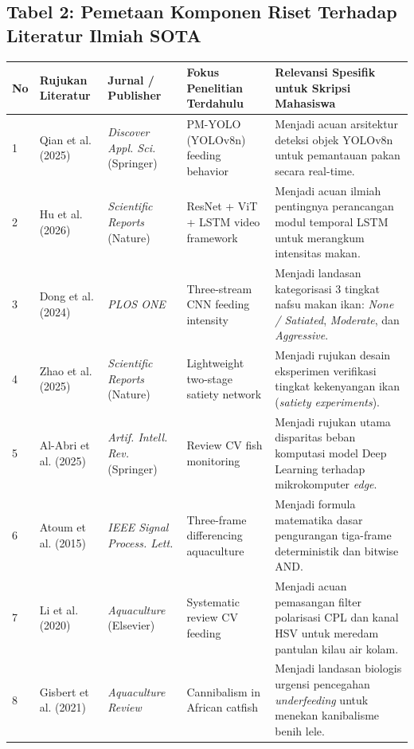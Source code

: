 \documentclass[10pt,a4paper]{article}
\begin{document}
\subsection*{Tabel 2: Pemetaan Komponen Riset Terhadap Literatur Ilmiah SOTA}
\vspace{-0.2cm}
{\footnotesize
\setlength{\tabcolsep}{3pt}
\begin{center}
\begin{tabular}{|p{0.5cm}|p{3.2cm}|p{2.8cm}|p{4.2cm}|p{5.5cm}|}
\hline
\textbf{No} & \textbf{Rujukan Literatur} & \textbf{Jurnal / Publisher} & \textbf{Fokus Penelitian Terdahulu} & \textbf{Relevansi Spesifik untuk Skripsi Mahasiswa} \\
\hline
1 & Qian et al. (2025) \cite{Qian2025} & \textit{Discover Appl. Sci.} (Springer) & PM-YOLO (YOLOv8n) feeding behavior & Menjadi acuan arsitektur deteksi objek YOLOv8n untuk pemantauan pakan secara real-time. \\
\hline
2 & Hu et al. (2026) \cite{Hu2026} & \textit{Scientific Reports} (Nature) & ResNet + ViT + LSTM video framework & Menjadi acuan ilmiah pentingnya perancangan modul temporal LSTM untuk merangkum intensitas makan. \\
\hline
3 & Dong et al. (2024) \cite{Dong2024} & \textit{PLOS ONE} & Three-stream CNN feeding intensity & Menjadi landasan kategorisasi 3 tingkat nafsu makan ikan: \textit{None / Satiated}, \textit{Moderate}, dan \textit{Aggressive}. \\
\hline
4 & Zhao et al. (2025) \cite{Zhao2025} & \textit{Scientific Reports} (Nature) & Lightweight two-stage satiety network & Menjadi rujukan desain eksperimen verifikasi tingkat kekenyangan ikan (\textit{satiety experiments}). \\
\hline
5 & Al-Abri et al. (2025) \cite{Al-Abri2025} & \textit{Artif. Intell. Rev.} (Springer) & Review CV fish monitoring & Menjadi rujukan utama disparitas beban komputasi model Deep Learning terhadap mikrokomputer \textit{edge}. \\
\hline
6 & Atoum et al. (2015) \cite{Atoum2015} & \textit{IEEE Signal Process. Lett.} & Three-frame differencing aquaculture & Menjadi formula matematika dasar pengurangan tiga-frame deterministik dan bitwise AND. \\
\hline
7 & Li et al. (2020) \cite{Li2020} & \textit{Aquaculture} (Elsevier) & Systematic review CV feeding & Menjadi acuan pemasangan filter polarisasi CPL dan kanal HSV untuk meredam pantulan kilau air kolam. \\
\hline
8 & Gisbert et al. (2021) \cite{gisbert2021development} & \textit{Aquaculture Review} & Cannibalism in African catfish & Menjadi landasan biologis urgensi pencegahan \textit{underfeeding} untuk menekan kanibalisme benih lele. \\
\hline
\end{tabular}
\end{center}
}
\end{document}

